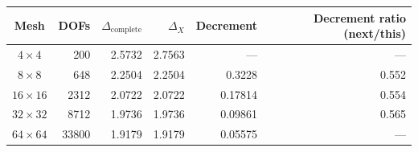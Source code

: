\begin{tabular}{@{}c r r r r r@{}}
\toprule
Mesh & DOFs & $\Delta_{\mathrm{complete}}$ & $\Delta_X$ & Decrement & Decrement ratio (next/this) \\
\midrule
$4\times4$ & 200 & 2.5732 & 2.7563 & --- & --- \\
$8\times8$ & 648 & 2.2504 & 2.2504 & 0.3228 & 0.552 \\
$16\times16$ & 2312 & 2.0722 & 2.0722 & 0.17814 & 0.554 \\
$32\times32$ & 8712 & 1.9736 & 1.9736 & 0.09861 & 0.565 \\
$64\times64$ & 33800 & 1.9179 & 1.9179 & 0.05575 & --- \\
\bottomrule
\end{tabular}
